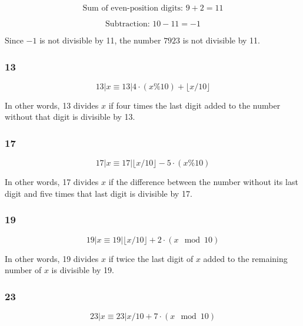 \[
\text{Sum of even-position digits: } 9 + 2 = 11
\]

\[
\text{Subtraction: } 10 - 11 = -1
\]

Since \(-1\) is not divisible by 11, the number \(7923\) is not divisible by 11.

\subsubsection{13}

\begin{equation}
    13 | x \equiv 13 | 4 \cdot (x\%10) + \lfloor x/10 \rfloor
\end{equation}

In other words, 13 divides $x$ if four times the last digit added to the number without that digit is divisible by 13.

\subsubsection{17}

\begin{equation}
    17 | x \equiv 17 |  \lfloor x/10 \rfloor - 5 \cdot (x \% 10)
\end{equation}

In other words, 17 divides $x$ if the difference between the number without its last digit and five times that last digit is divisible by 17.

\subsubsection{19}

\begin{equation}
    19 | x \equiv 19 | \lfloor x / 10 \rfloor + 2 \cdot (x \mod 10)
\end{equation}

In other words, 19 divides $x$ if twice the last digit of $x$ added to the remaining number of $x$ is divisible by 19.

\subsubsection{23}

\begin{equation}
    23 | x \equiv 23 |  x / 10  + 7 \cdot (x \mod 10)
\end{equation}
